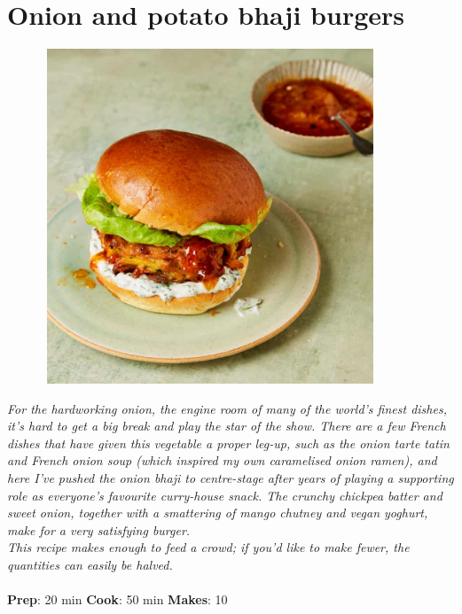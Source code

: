 \documentclass{book}
\begin{document}
\section{Onion and potato bhaji burgers}
\begin{figure}
\centering\includegraphics[width=10cm,height=10cm,keepaspectratio]{Recipe_Pictures/Onion_and_potato_bhaji_burgers.png}
\end{figure}
\emph{For the hardworking onion, the engine room of many of the world’s finest dishes, it’s hard to get a big break and play the star of the show. There are a few French dishes that have given this vegetable a proper leg-up, such as the onion tarte tatin and French onion soup (which inspired my own caramelised onion ramen), and here I’ve pushed the onion bhaji to centre-stage after years of playing a supporting role as everyone’s favourite curry-house snack. The crunchy chickpea batter and sweet onion, together with a smattering of mango chutney and vegan yoghurt, make for a very satisfying burger.\\ 
This recipe makes enough to feed a crowd; if you’d like to make fewer, the quantities can easily be halved.}\\\\ 
\textbf{Prep}: 20 min
\textbf{Cook}: 50 min
\textbf{Makes}: 10
\end{document}
